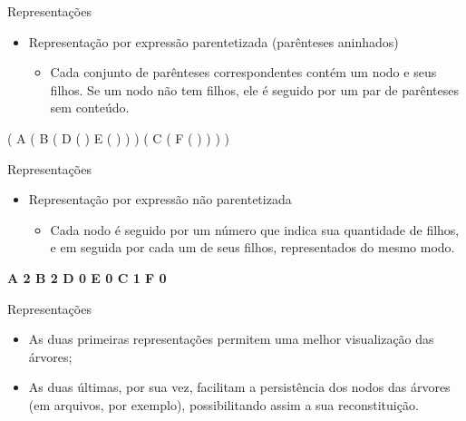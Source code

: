 \documentclass[12pt,table,xcolor={dvipsnames}]{beamer}
\begin{document}
\begin{frame}[fragile]{Representações}
\begin{itemize}
\item Representação por expressão parentetizada (parênteses aninhados)
\begin{itemize}
\item  Cada conjunto de parênteses correspondentes contém um nodo e seus filhos. Se um nodo não tem filhos, ele é seguido por um par de parênteses sem conteúdo.
\end{itemize}
\end{itemize}
\begin{center}
 ( A ( \color{red} B ( \color{blue} D ( ) E ( ) \color{red}) \color{black} ) ( \color{red} C ( \color{blue}F ( ) \color{red} ) \color{black} ) )
\end{center}
\end{frame}

\begin{frame}[fragile]{Representações}
\begin{itemize}
\item Representação por expressão	não parentetizada
\begin{itemize}
\item  Cada nodo é seguido por um número que indica sua quantidade de filhos, e em seguida por cada um de seus filhos, representados do mesmo modo.
\end{itemize}
\end{itemize}
\begin{center}
\textbf{A 2 \color{red} B 2 \color{blue} D 0 E 0 \color{red} C 1 \color{blue} F 0} 
\end{center}
\end{frame}

\begin{frame}[fragile]{Representações}
\begin{itemize}
\item As duas primeiras representações permitem uma melhor visualização das árvores; 
\item As duas últimas, por sua vez, facilitam a persistência dos nodos das árvores (em arquivos, por exemplo), possibilitando assim a sua reconstituição.
\end{itemize}
\end{frame}
\end{document}
